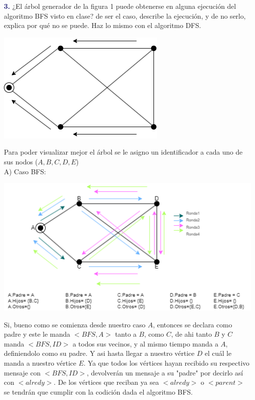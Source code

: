 \newpage
\textbf{\textcolor{MidnightBlue}{3.}}
¿El árbol generador de la figura 1 puede obtenerse en alguna ejecución del algoritmo
BFS visto en clase? de ser el caso, describe la ejecución, y de no serlo, explica por qué no se puede.
Haz lo mismo con el algoritmo DFS.\\

\begin{center}
        \includegraphics[scale=0.7]{grapho.png}
    \end{center}
Para poder visualizar mejor el árbol se le asigno un identificador a cada uno de
sus nodos ($A,B,C,D,E$)\\

A) Caso BFS:
    \begin{center}
        \includegraphics[scale=0.8]{grapho1.png}
    \end{center}
Si, bueno como se comienza desde nuestro caso $A$, entonces se declara como padre y este
le manda $<BFS,A>$ tanto a $B$, como $C$, de ahi tanto $B$ y $C$ manda $<BFS,ID>$ a todos sus vecinos,
y al mismo tiempo manda a $A$, definiendolo como su padre. Y asi hasta llegar a nuestro
vértice $D$ el cuál le manda a nuestro vértice $E$. Ya que todos los vértices hayan
recibido su respectivo mensaje con $<BFS,ID>$, devolverán un mensaje a su "padre" por decirlo
así con $<alredy>$. De los vértices que reciban ya sea $<alredy>$ o $<parent>$ se tendrán que cumplir
con la codición dada el algoritmo BFS.\\

